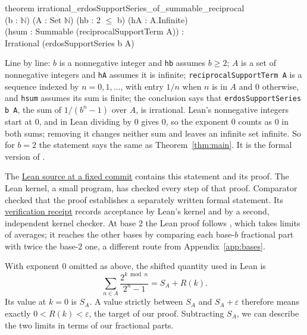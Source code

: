 \documentclass[10pt]{article}
\theoremstyle{plain}
\theoremstyle{definition}
\theoremstyle{remark}
\begin{document}
\begin{center}
\begin{minipage}{0.9\linewidth}
\small\ttfamily
theorem irrational\_erdosSupportSeries\_of\_summable\_reciprocal\\
\hspace*{2em}(b : $\mathbb{N}$) (A : Set $\mathbb{N}$) (hb : 2 $\le$ b) (hA : A.Infinite)\\
\hspace*{2em}(hsum : Summable (reciprocalSupportTerm A)) :\\
\hspace*{2em}Irrational (erdosSupportSeries b A)
\end{minipage}
\end{center}
Line by line: $b$ is a nonnegative integer and \texttt{hb} assumes $b\ge2$; $A$ is a
set of nonnegative integers and \texttt{hA} assumes it is infinite;
\texttt{reciprocalSupportTerm A} is a sequence indexed by $n=0,1,\dots$, with entry $1/n$ when
$n$ is in $A$ and $0$ otherwise, and \texttt{hsum} assumes its sum is finite;
the conclusion says that \texttt{erdosSupportSeries b A}, the sum of
$1/(b^n-1)$ over $A$, is irrational. Lean's nonnegative integers start at $0$, and in
Lean dividing by $0$ gives $0$, so the exponent $0$ counts as $0$ in both sums;
removing it changes neither sum and leaves an infinite set infinite. So for
$b=2$ the statement says the same as Theorem~\ref{thm:main}. It is the formal
version of \cite[Theorem~A.1]{shortpaper}.

The \href{https://github.com/wcook04/plectis-erdos/blob/436f55ebdafa67e4af0fff79f621c13f2ded12bf/lean/Erdos249257/AllBaseReciprocalSupportIrrationality.lean#L395}{Lean source at a fixed commit}
contains this statement and its proof. The Lean kernel, a small program,
has checked every step of that proof.
Comparator checked that the proof establishes a separately written formal
statement. Its \href{https://github.com/wcook04/plectis-erdos/blob/0064fc9b2a2693de97aebc8abec26090c3cd1095/evidence/comparator/replay-35935225572/receipt-E257_47.json}{verification receipt}
records acceptance by Lean's kernel and by a second, independent kernel
checker. At base $2$ the Lean proof follows \cite[Appendix~A]{shortpaper},
which takes limits of averages; it reaches the other bases by comparing each
base-$b$ fractional part with twice the base-$2$ one, a different route from
Appendix~\ref{app:bases}.

With exponent $0$ omitted as above, the shifted quantity used in Lean is
\[
 \sum_{n\in A}\frac{2^{k\bmod n}}{2^n-1}=S_A+R(k).
\]
Its value at $k=0$ is $S_A$. A value strictly between $S_A$ and
$S_A+\varepsilon$ therefore means exactly $0<R(k)<\varepsilon$, the target of our
proof. Subtracting $S_A$, we can describe the two limits in terms of our
fractional parts.
\end{document}
